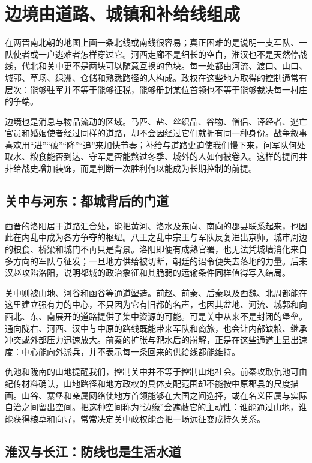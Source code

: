 \section{边境由道路、城镇和补给线组成}
\label{sec:synthesis-frontiers}

在两晋南北朝的地图上画一条北线或南线很容易；真正困难的是说明一支军队、一队使者或一户逃难者怎样穿过它。河西走廊不是细长的空白，淮汉也不是天然停战线，代北和关中更不是两块可以随意互换的色块。每一处都由河流、渡口、山口、城郭、草场、绿洲、仓储和熟悉路径的人构成。政权在这些地方取得的控制通常有层次：能够驻军并不等于能够征税，能够册封某位首领也不等于能够裁决每一村庄的争端。

边境也是消息与物品流动的区域。马匹、盐、丝织品、谷物、僧侣、译经者、逃亡官员和婚姻使者经过同样的道路，却不会因经过它们就拥有同一种身份。战争叙事喜欢用“进”“破”“降”“追”来加快节奏；补给与道路史迫使我们慢下来，问军队何处取水、粮食能否到达、守军是否能熬过冬季、城外的人如何被卷入。这样的提问并非给战史增加装饰，而是判断一次胜利何以能成为长期控制的前提。

\subsection{关中与河东：都城背后的门道}

西晋的洛阳居于道路汇合处，能把黄河、洛水及东向、南向的郡县联系起来，也因此在内乱中成为各方争夺的枢纽。八王之乱中宗王与军队反复进出京师，城市周边的粮食、桥梁和城门不再只是背景。洛阳即便有成熟官署，也无法凭城墙消化来自多方向的军队与征发；一旦地方供给被切断，朝廷的诏令便失去落地的力量。后来汉赵攻陷洛阳，说明都城的政治象征和其脆弱的运输条件同样值得写入结局。

关中则被山地、河谷和函谷等通道塑造。前赵、前秦、后秦以及西魏、北周都能在这里建立强有力的中心，不只因为它有旧都的名声，也因其盆地、河流、城郭和向西北、东、南展开的道路提供了集中资源的可能。可是关中从来不是封闭的堡垒。通向陇右、河西、汉中与中原的路线既能带来军队和商旅，也会让内部缺粮、继承冲突或外部压力迅速放大。前秦的扩张与淝水后的崩解，正是在这些通道上显出速度：中心能向外派兵，并不表示每一条回来的供给线都能维持。

仇池和陇南的山地提醒我们，控制关中并不等于控制山地社会。前秦攻取仇池可由纪传材料确认，山地路径和地方政权的具体支配范围却不能按中原郡县的尺度描画。山谷、寨堡和亲属网络使地方首领能够在大国之间选择，或在名义臣属与实际自治之间留出空间。把这种空间称为“边缘”会遮蔽它的主动性：谁能通过山地，谁能获得粮草和向导，常常决定关中政权能否把一场远征变成持久关系。

\subsection{淮汉与长江：防线也是生活水道}

